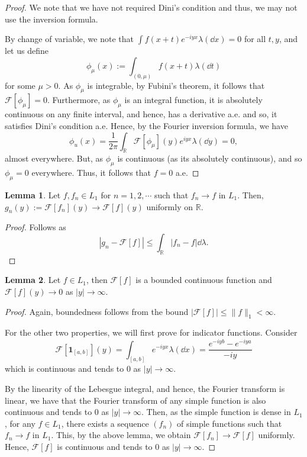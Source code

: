 \documentclass[]{article}
\theoremstyle{definition}
\theoremstyle{definition}
\newtheorem{lemma}{Lemma}[section]
\begin{document}
\begin{proof}
  We note that we have not required Dini's condition and thus, we may not use 
  the inversion formula. 

  By change of variable, we note that \(\int f(x + t)e^{-i yx} \lambda(\dd x) = 0\) 
  for all \(t, y\), and let us define 
  \[\phi_\mu(x) := \int_{(0, \mu)} f(x + t) \lambda(\dd t)\]
  for some \(\mu > 0\). As \(\phi_\mu\) is integrable, by Fubini's theorem, it 
  follows that \(\mathcal{F}[\phi_\mu] = 0\). Furthermore, as \(\phi_\mu\) is 
  an integral function, it is absolutely continuous on any finite interval, and hence, 
  has a derivative a.e. and so, it satisfies Dini's condition a.e. Hence, by the 
  Fourier inversion formula, we have 
  \[\phi_u(x) = \frac{1}{2\pi}\int_{\mathbb{R}} \mathcal{F}[\phi_\mu](y)e^{iyx} \lambda(\dd y) = 0,\]
  almost everywhere. But, as \(\phi_\mu\) is continuous (as its absolutely continuous), 
  and so \(\phi_\mu = 0\) everywhere. Thus, it follows that \(f = 0\) a.e.
\end{proof}

\begin{lemma}
  Let \(f, f_n \in L_1\) for \(n = 1, 2, \cdots\) such that \(f_n \to f\) in \(L_1\). 
  Then, \(g_n(y) := \mathcal{F}[f_n](y) \to \mathcal{F}[f](y)\) uniformly on \(\mathbb{R}\).
\end{lemma}
\begin{proof}
  Follows as 
  \[|g_n - \mathcal{F}[f]| \le \int_{\mathbb{R}} |f_n - f| \dd \lambda.\]
\end{proof}

\begin{lemma}
  Let \(f \in L_1\), then \(\mathcal{F}[f]\) is a bounded continuous function and 
  \(\mathcal{F}[f](y) \to 0\) as \(|y| \to \infty\). 
\end{lemma}
\begin{proof}
  Again, boundedness follows from the bound \(|\mathcal{F}[f]| \le \|f\|_1 < \infty\).

  For the other two properties, we will first prove for indicator functions.
  Consider 
  \[\mathcal{F}[\mathbf{1}_{[a, b]}](y) = \int_{[a, b]} e^{-iy x} \lambda(\dd x) 
    = \frac{e^{-i yb} - e^{-iy a}}{-iy}\]
  which is continuous and tends to 0 as \(|y| \to \infty\).
  
  By the linearity of the Lebesgue integral, and hence, the Fourier transform is 
  linear, we have that the Fourier transform of any simple function is also 
  continuous and tends to 0 as \(|y| \to \infty\). Then, as the simple function 
  is dense in \(L_1\), for any \(f \in L_1\), there exists a sequence \((f_n)\) of 
  simple functions such that \(f_n \to f\) in \(L_1\). This, by the above lemma, 
  we obtain \(\mathcal{F}[f_n] \to \mathcal{F}[f]\) uniformly. Hence, 
  \(\mathcal{F}[f]\) is continuous and tends to 0 as \(|y| \to \infty\).
\end{proof}
\end{document}
